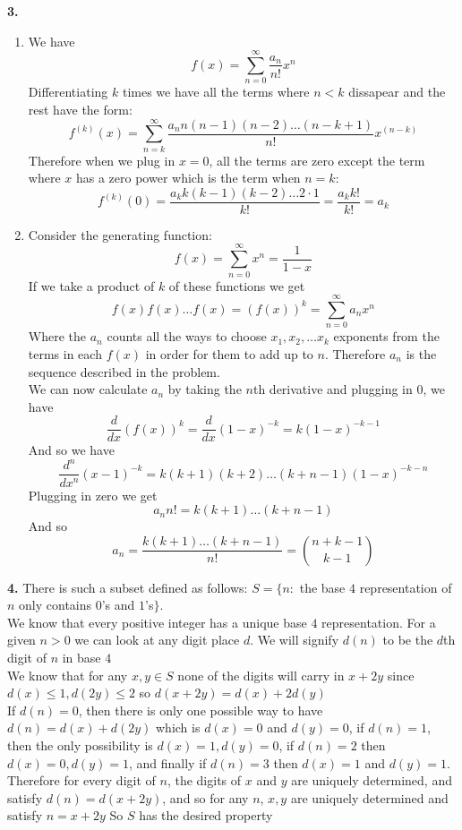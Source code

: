 \documentclass[12pt]{article}
\newenvironment{ques}{\vspace{2 ex}}{\vspace{2 ex}}
\theoremstyle{definition}
\begin{document}
\begin{ques}
	\textbf{3.} 
		\begin{enumerate}
			\item
				We have
				$$f(x) = \sum_{n = 0}^\infty \frac{a_n}{n!}x^n$$
				Differentiating $k$ times we have all the terms
				where $n < k$ dissapear and the rest have the
				form:
				$$f^{(k)}(x) = \sum_{n = k}^\infty \frac{a_n
				n(n-1)(n -2) \dots (n-k + 1)}{n!}x^{(n - k)}$$
				Therefore when we plug in $x = 0$, all the
				terms are zero except the term where $x$ has a
				zero power which is the term when $n = k$:
				$$f^{(k)}(0) = \frac{a_k k(k-1)(k-2) \dots 2
				\cdot 1}{k!} = \frac{a_kk!}{k!} = a_k$$
			\item
				Consider the generating function:
				$$f(x) = \sum_{n=0}^\infty x^n = \frac{1}{1 - x}$$
				If we take a product of $k$ of these functions we get
				$$f(x)f(x)\dots f(x) = (f(x))^k = \sum_{n=0}^\infty a_nx^n$$
				Where the $a_n$ counts all the ways to choose
				$x_1, x_2, \dots x_k$ exponents from the terms
				in each $f(x)$ in order for
				them to add up to $n$. Therefore $a_n$ is the
				sequence described in the problem.\\
				We can now calculate $a_n$ by taking the $n$th
				derivative and plugging in $0$, we have
				$$\frac{d}{dx} (f(x))^k = \frac{d}{dx}(1 -
				x)^{-k} = k(1-x)^{-k -1}$$
				And so we have
				$$\frac{d^n}{dx^n} (x -1)^{-k} = k(k+1)(k+2)
				\dots (k+n - 1)(1-x)^{-k-n}$$
				Plugging in zero we get
				$$a_n n! = k(k + 1) \dots (k+n-1)$$
				And so 
				$$a_n = \frac{k(k+1) \dots (k+n-1)}{n!} =
				\binom{n + k -1}{k-1}$$
		\end{enumerate}
\end{ques}

\begin{ques}
	\textbf{4.} 
		There is such a subset defined as follows:
		$S = \{n:$ the base $4$ representation of $n$ only contains
		$0$'s and $1$'s$\}$.\\
		We know that every positive integer has a unique base $4$
		representation. For a given $n > 0$ we can look at any digit
		place $d$. We will signify $d(n)$ to be the $d$th digit of $n$
		in base $4$\\
		We know that for any $x, y \in S$ none of the digits will carry
		in $x + 2y$ since $d(x) \leq 1, d(2y) \leq 2$ so $d(x + 2y) =
		d(x) + 2d(y)$\\
		If $d(n) = 0$, then there is only one possible way to have
		$d(n) = d(x) + d(2y)$ which is $d(x) = 0$ and $d(y) = 0$, if
		$d(n) = 1$, then the only possibility is  $d(x) = 1, d(y) = 0$,
		if $d(n) = 2$ then $d(x) = 0, d(y) = 1$, and finally if $d(n) =
		3$ then $d(x) = 1$ and $d(y) = 1$.\\
		Therefore for every digit of $n$, the digits of $x$ and $y$ are
		uniquely determined, and satisfy $d(n) = d(x + 2y)$, and so for
		any $n$, $x, y$ are uniquely determined and satisfy $n = x +
		2y$ So $S$
		has the desired property
		
\end{ques}
\end{document}
